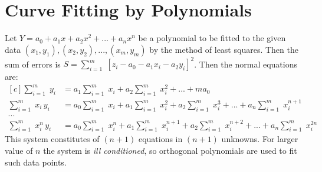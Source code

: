 \documentclass[aima203_lecturenotes_ku.tex]{subfiles}
\begin{document}
\section{Curve Fitting by Polynomials}
Let $Y = a_0 + a_1x +a_2x^2+ ...+ a_nx^n$ be a polynomial to be fitted to the given data $(x_1,y_1), (x_2,y_2),...,(x_m,y_m)$ by the method of least squares. Then the sum of errors is $\displaystyle S = \sum_{i=1}^m \; [z_i - a_0 - a_1x_i-a_2y_i]^2$. Then the normal equations are:
\begin{equation}
  \label{polynormal}
  \begin{aligned}[c]
    \sum_{i=1}^m \; y_i &= a_1 \sum_{i=1}^m \;x_i + a_2 \sum_{i=1}^m \;x_i^2 + ...+ ma_0 \\[1mm]
    \sum_{i=1}^m \; x_i\,y_i &= a_0\sum_{i=1}^m \;x_i + a_1 \sum_{i=1}^m \;x_i^2 + a_2 \sum_{i=1}^m \;x_i^3 + ... + a_n \sum_{i=1}^m\; x_i^{n+1} \\[1mm]
    ... \\[1mm]
    \sum_{i=1}^m \; x_i^n\,y_i &= a_0\sum_{i=1}^m \;x_i^n + a_1 \sum_{i=1}^m \;x_i^{n+1} + a_2 \sum_{i=1}^m \;x_i^{n+2} + ... + a_n \sum_{i=1}^m\; x_i^{2n}
  \end{aligned}
\end{equation}
This system constitutes of $(n+1)$ equations in $(n+1)$ unknowns. For larger value of $n$ the system is \textit{ill conditioned}, so orthogonal polynomials are used to fit such data points.
\end{document}
